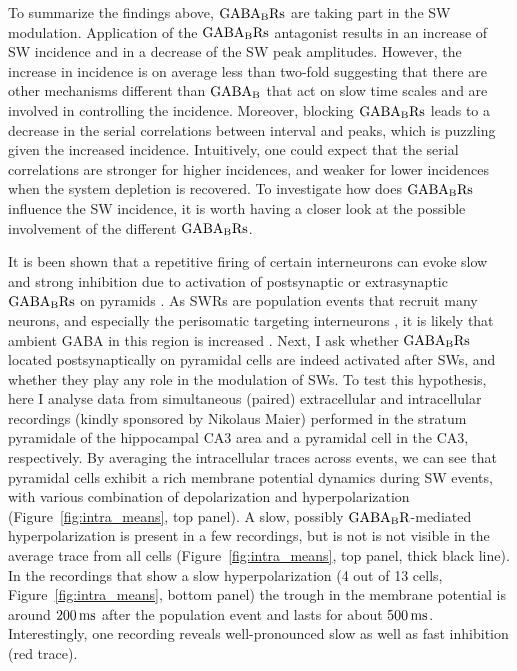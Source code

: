     To summarize the findings above, $\rm GABA_B Rs$ are taking part in the SW
    modulation. Application of the $\rm GABA_B Rs$ antagonist results in an
    increase of SW incidence and in a decrease of the SW peak amplitudes.
    However, the increase in incidence is on average less than two-fold
    suggesting that there are other mechanisms different than $\rm GABA_B$ that
    act on slow time scales and are involved in controlling the incidence.
    Moreover, blocking $\rm GABA_B Rs$ leads to a decrease in the serial
    correlations between interval and peaks, which is puzzling given the
    increased incidence. Intuitively, one could expect that the serial
    correlations are stronger for higher incidences, and weaker for lower
    incidences when the system depletion is recovered. To investigate how does
    $\rm GABA_B Rs$ influence the SW incidence, it is worth having a closer
    look at the possible involvement of the different $\rm GABA_BRs$.

    It is been shown that a repetitive firing of certain interneurons can evoke
    slow and strong inhibition due to activation of postsynaptic or
    extrasynaptic $\rm GABA_BRs$ on pyramids \citep{Scanziani2000,
    Gassmann2012}. As SWRs are population events that recruit many
    neurons, and especially the perisomatic targeting interneurons
    \citep{Klausberger2009, Hajos2013}, it is likely that ambient GABA in this
    region is increased \citep{Hollnagel2014, Lang2014}. Next, I ask whether
    $\rm GABA_BRs$ located postsynaptically on pyramidal cells are indeed
    activated after SWs, and whether they play any role in the modulation of
    SWs. To test this hypothesis, here I analyse data from simultaneous
    (paired) extracellular and intracellular recordings (kindly sponsored by Nikolaus Maier) performed in the
    stratum pyramidale of the hippocampal CA3 area and a pyramidal cell in the
    CA3, respectively. By averaging the intracellular traces across events, we
    can see that pyramidal cells exhibit a rich membrane potential dynamics
    during SW events, with various combination of depolarization and
    hyperpolarization (Figure~\ref{fig:intra_means}, top panel). A slow,
    possibly $\rm GABA_BR$-mediated hyperpolarization is present in a few recordings, but
    is not is not visible in the average trace from all cells
    (Figure~\ref{fig:intra_means}, top panel, thick black line). In the
    recordings that show a slow hyperpolarization (4 out of 13 cells,
    Figure~\ref{fig:intra_means}, bottom panel) the trough in the membrane
    potential is around $200 \, \rm ms$ after the population event and lasts
    for about $500 \, \rm ms$. Interestingly, one recording reveals
    well-pronounced slow as well as fast inhibition (red trace).

